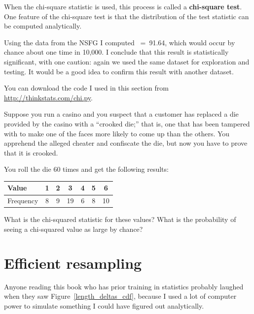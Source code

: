 \documentclass[12pt]{book}
\begin{document}
When the chi-square statistic is used, this process is called a 
{\bf chi-square test}.  One feature of the chi-square test is that
the distribution of the test statistic can be computed analytically.

Using the data from the NSFG I computed \mychi{}~=~91.64, which would
occur by chance about one time in 10,000.  I conclude that this result
is statistically significant, with one caution: again we used the
same dataset for exploration and testing.  It would be a good idea
to confirm this result with another dataset.

You can download the code I used in this section from
\url{http://thinkstats.com/chi.py}.



\begin{exercise}
Suppose you run a casino and you suspect that a customer has
replaced a die provided by the casino with a ``crooked die;'' that
is, one that has been tampered with to make one of the faces more
likely to come up than the others.  You apprehend the alleged
cheater and confiscate the die, but now you have to prove that it
is crooked.

You roll the die 60 times and get the following results:

\begin{center}
\begin{tabular}{|l|c|c|c|c|c|c|}
\hline
Value     &  1  &  2  &  3  &  4  &  5  &  6  \\ 
\hline
\hline
Frequency &  8  &  9  &  19  &  6  &  8  &  10  \\
\hline
\end{tabular}
\end{center}

What is the chi-squared statistic for these values?  What is the
probability of seeing a chi-squared value as large by chance?

\end{exercise}




\section{Efficient resampling}

Anyone reading this book who has prior training in statistics probably
laughed when they saw Figure~\ref{length_deltas_cdf}, because I used a
lot of computer power to simulate something I could have figured out
analytically.
\end{document}
